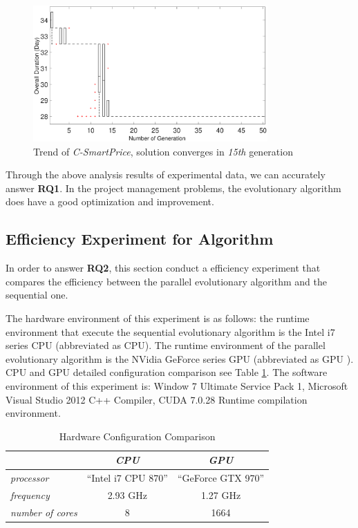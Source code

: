 \begin{figure}[!htb]
  \centering
  \includegraphics[width=0.8\textwidth]{figures/fig_pa3.eps}
  \caption{Trend of \emph{C-SmartPrice}, solution converges in \emph{15th} generation}
  \label{fig:pa3}
\end{figure}

Through the above analysis results of experimental data, we can accurately
answer \textbf{RQ1}. In the project management problems, the evolutionary
algorithm does have a good optimization and improvement.


\subsection{Efficiency Experiment for Algorithm}
%
In order to answer \textbf{RQ2}, this section conduct a efficiency experiment
that compares the efficiency between the parallel evolutionary algorithm and the
sequential one.

The hardware environment of this experiment is as follows: the runtime
environment that execute the sequential evolutionary algorithm is the Intel i7
series CPU (abbreviated as CPU). The runtime environment of the parallel
evolutionary algorithm is the NVidia GeForce series GPU (abbreviated as GPU
). CPU and GPU detailed configuration comparison see Table \ref{tab:cpugpu}. The
software environment of this experiment is: Window 7 Ultimate Service Pack 1,
Microsoft Visual Studio 2012 C++ Compiler, CUDA 7.0.28 Runtime compilation
environment.

\begin{table}[!ht]
  \centering
  \caption{Hardware Configuration Comparison}
  \label{tab:cpugpu}
  \begin{tabular}{lcc}
    \hline
        & \emph{ CPU } & \emph{ GPU } \\
    \hline
    \emph{ processor } & ``Intel i7 CPU 870'' & ``GeForce GTX 970'' \\
    \emph{ frequency } & 2.93 GHz & 1.27 GHz \\
    \emph{ number of cores } & 8 & 1664 \\
    \hline
  \end{tabular}
\end{table}

